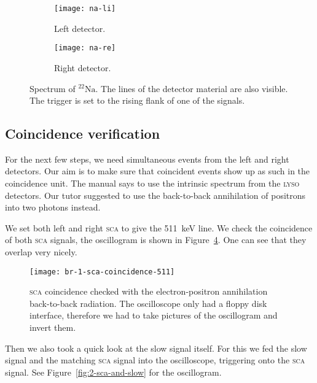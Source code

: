 \documentclass[11pt, english, fleqn, DIV=15, headinclude, BCOR=2cm]{scrreprt}
\begin{document}
\begin{figure}
        \centering
        \begin{subfigure}[c]{.49\linewidth}
                \centering
                \texttt{[image: na-li]}
                \caption{%
                        Left detector.
                }
                \label{fig:na-li}
        \end{subfigure}
        \hfill
        \begin{subfigure}[c]{.49\linewidth}
                \centering
                \texttt{[image: na-re]}
                \caption{%
                        Right detector.
                }
                \label{fig:na-re}
        \end{subfigure}
        \caption{%
                Spectrum of ${}^{22}\text{Na}$. The lines of the detector
                material are also visible. The trigger is set to the rising
                flank of one of the signals.
        }
        \label{fig:natrium}
\end{figure}

\subsection{Coincidence verification}

For the next few steps, we need simultaneous events from the left and right
detectors. Our aim is to make sure that coincident events show up as such in
the coincidence unit. The manual says to use the intrinsic spectrum from the
\textsc{lyso} detectors. Our tutor suggested to use the back-to-back
annihilation of positrons into two photons instead.

We set both left and right \textsc{sca} to give the
\SI{511}{\kilo\electronvolt} line. We check the coincidence of both
\textsc{sca} signals, the oscillogram is shown in
Figure~\ref{fig:1-sca-coincidence-511}. One can see that they overlap very
nicely.

\begin{figure}
    \centering
    \texttt{[image: br-1-sca-coincidence-511]}
    \caption{%
        \textsc{sca} coincidence checked with the electron-positron
        annihilation back-to-back radiation. The oscilloscope only had a floppy
        disk interface, therefore we had to take pictures of the oscillogram
        and invert them.
    }
    \label{fig:1-sca-coincidence-511}
\end{figure}

Then we also took a quick look at the slow signal itself. For this we fed the
slow signal and the matching \textsc{sca} signal into the oscilloscope,
triggering onto the \textsc{sca} signal. See Figure~\ref{fig:2-sca-and-slow}
for the oscillogram.
\end{document}
